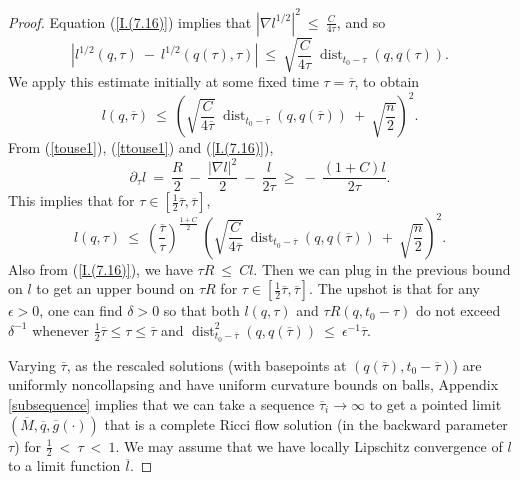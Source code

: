 \documentclass[12pt]{amsart}
\newcommand{\dist}{\operatorname{dist}}
\numberwithin{equation}{section}
\theoremstyle{plain}
\theoremstyle{definition}
\theoremstyle{remark}
\begin{document}
\begin{proof}

Equation (\ref{I.(7.16)}) implies that
$|\nabla l^{1/2}|^2 \: \le \: \frac{C}{4\tau}$, and so
\begin{equation}
|l^{1/2}(q,\tau) \: - \: l^{1/2}(q(\tau),\tau)| \: 
\le \: \sqrt{\frac{C}{4\tau}}
\: \dist_{t_0-\tau}(q, q(\tau)).
\end{equation}
We apply this estimate initially at some fixed time $\tau = \overline{\tau}$, to
obtain
\begin{equation}
l(q, \overline{\tau}) \: \le \: \left( \sqrt{\frac{C}{4\overline{\tau}}}
\: \dist_{t_0- \overline{\tau}}(q, q(\overline{\tau})) \: + \: 
\sqrt{\frac{n}{2}} \right)^2.
\end{equation}
From (\ref{touse1}), (\ref{ttouse1}) and (\ref{I.(7.16)}), 
\begin{equation}
\partial_\tau l \: = \: \frac{R}{2} \: - \: \frac{|\nabla l|^2}{2}
\: - \: \frac{l}{2\tau} \: \ge \: - \: \frac{(1+C)l}{2\tau}.
\end{equation}
This implies that for $\tau \in \left[ \frac12 \overline{\tau},
\overline{\tau} \right]$,
\begin{equation} \label{upperl}
l(q, {\tau}) \: \le \: \left( \frac{\overline{\tau}}{\tau}
\right)^{\frac{1+C}{2}} \:
\left( \sqrt{\frac{C}{4\overline{\tau}}}
\: \dist_{t_0- \overline{\tau}}(q, q(\overline{\tau})) \: + \: 
\sqrt{\frac{n}{2}} \right)^2.
\end{equation}
Also from (\ref{I.(7.16)}), we have
$\tau R \: \le \: Cl$.
Then we can plug in the previous bound on 
$l$ to get an upper bound on $\tau R$ for
$\tau \in \left[ \frac12 \overline{\tau}, \overline{\tau} \right]$.
The upshot is that for any $\epsilon > 0$, one can find $\delta > 0$
so that both $l(q,\tau)$ and $\tau R(q, t_0-\tau)$ do not exceed
$\delta^{-1}$ whenever $\frac12 \overline{\tau} \le \tau \le \overline{\tau}$
and $\dist^2_{t_0-\overline{\tau}} (q, q(\overline{\tau})) \: \le \:
\epsilon^{-1} \overline{\tau}$.

Varying $\overline{\tau}$, as the rescaled solutions
(with basepoints at $(q(\overline{\tau}), t_0 - \overline{\tau})$) 
are uniformly noncollapsing and have
uniform curvature bounds on balls, Appendix \ref{subsequence} 
implies that
we can take
a sequence $\overline{\tau}_i \rightarrow \infty$
to get a pointed limit 
$(\overline{M}, \overline{q}, \overline{g}(\cdot))$ that is
a complete Ricci flow solution (in the backward parameter $\tau$) for
$\frac12 \: < \: \tau \: < \: 1$. 
We may assume that we have locally Lipschitz convergence of $l$ to
a limit function $\overline{l}$.


\end{proof}
\end{document}
